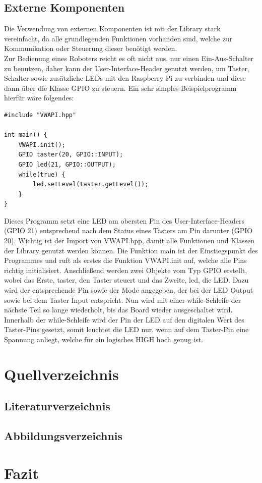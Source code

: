 \documentclass[12pt]{article}
\begin{document}
\subsection{Externe Komponenten}
Die Verwendung von externen Komponenten ist mit der Library stark vereinfacht, da alle grundlegenden Funktionen vorhanden sind, welche zur Kommunikation oder Steuerung dieser benötigt werden.\\
Zur Bedienung eines Roboters reicht es oft nicht aus, nur einen Ein-Aus-Schalter zu benutzen, daher kann der User-Interface-Header genutzt werden, um Taster, Schalter sowie zusätzliche LEDs mit den Raspberry Pi zu verbinden und diese dann über die Klasse GPIO zu steuern. Ein sehr simples Beispielprogramm hierfür wäre folgendes:
\begin{verbatim}
#include "VWAPI.hpp"

int main() {
    VWAPI.init();
    GPIO taster(20, GPIO::INPUT);
    GPIO led(21, GPIO::OUTPUT);
    while(true) {
        led.setLevel(taster.getLevel());
    }
}
\end{verbatim}
Dieses Programm setzt eine LED am obersten Pin des User-Interface-Headers (GPIO 21) entsprechend nach dem Status eines Tasters am Pin darunter (GPIO 20). Wichtig ist der Import von VWAPI.hpp, damit alle Funktionen und Klassen der Library genutzt werden können. Die Funktion main ist der Einstiegspunkt des Programmes und ruft als erstes die Funktion VWAPI.init auf, welche alle Pins richtig initialisiert. Anschließend werden zwei Objekte vom Typ GPIO erstellt, wobei das Erste, taster, den Taster steuert und das Zweite, led, die LED. Dazu wird der entsprechende Pin sowie der Mode angegeben, der bei der LED Output sowie bei dem Taster Input entspricht. Nun wird mit einer while-Schleife der nächste Teil so lange wiederholt, bis das Board wieder ausgeschaltet wird. Innerhalb  der while-Schleife wird der Pin der LED auf den digitalen Wert des Taster-Pins gesetzt, somit leuchtet die LED nur, wenn auf dem Taster-Pin eine Spannung anliegt, welche für ein logisches HIGH hoch genug ist.
\newpage\section{Quellverzeichnis}
\subsection{Literaturverzeichnis}
\subsection{Abbildungsverzeichnis}
\newpage\section{Fazit}
\end{document}
